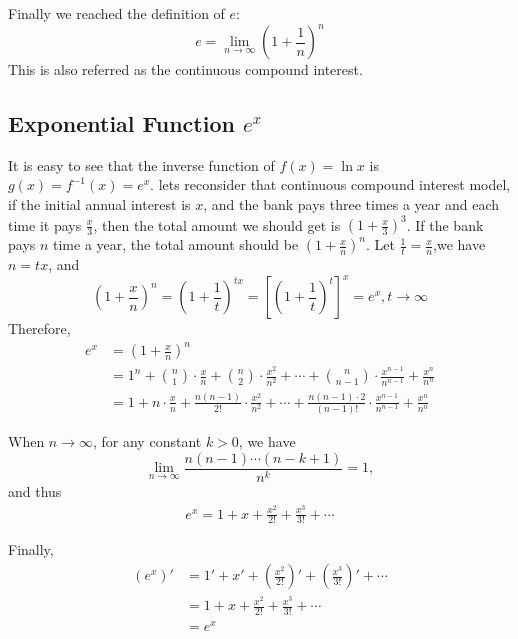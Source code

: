 \documentclass[11pt, oneside]{article}   	%
\begin{document}
Finally we reached the definition of $e$:
\[e=\lim_{n\rightarrow \infty}\left(1+\frac{1}{n}\right)^n\]
This is also referred as the continuous compound interest. 
\subsection{Exponential Function $e^x$} 
It is easy to see that the inverse function of $f(x)=\ln x$ is $g(x)=f^{-1}(x)=e^x$.
lets reconsider that continuous compound interest model, if the initial annual interest is $x$, and the bank pays three times a year and each time it pays $\frac{x}{3}$, then the total amount we should get is $\left(1+\frac{x}{3}\right)^3$. If the bank pays $n$ time a year, the total amount should be $(1+\frac{x}{n})^n$. Let $\frac{1}{t}=\frac{x}{n}$,we have $n=tx$, and \[\left(1+\frac{x}{n}\right)^n = \left(1+\frac{1}{t}\right)^{tx} = \left[\left(1+\frac{1}{t}\right)^t\right]^x=e^x, t\rightarrow \infty \]
Therefore, 
\begin{align*}
e^x&=\left(1+\frac{x}{n}\right)^n\\
&= 1^n+\binom{n}{1}\cdot\frac{x}{n} + \binom{n}{2}\cdot\frac{x^2}{n^2} + \cdots + \binom{n}{n-1}\cdot\frac{x^{n-1}}{n^{n-1}} + \frac{x^n}{n^n} \\
&=1+n\cdot\frac{x}{n}+\frac{n(n-1)}{2!}\cdot\frac{x^2}{n^2}+ \cdots + \frac{n(n-1)\cdot2}{(n-1)!}\cdot\frac{x^{n-1}}{n^{n-1}} + \frac{x^n}{n^n}
\end{align*}

When $n\rightarrow \infty$, for any constant $k>0$, we have
\[\lim_{n\rightarrow \infty} \frac{n(n-1)\cdots(n-k+1)}{n^k}=1,\] and thus 
\begin{align*}
e^x=1+x + \frac{x^2}{2!} + \frac{x^3}{3!} + \cdots
\end{align*} 

Finally,
\begin{align*}
(e^x)'&=1'+x' + \left(\frac{x^2}{2!}\right)' + \left(\frac{x^3}{3!}\right)' + \cdots\\
&=1+x + \frac{x^2}{2!} + \frac{x^3}{3!} + \cdots\\
&=e^x
\end{align*}
\end{document}
